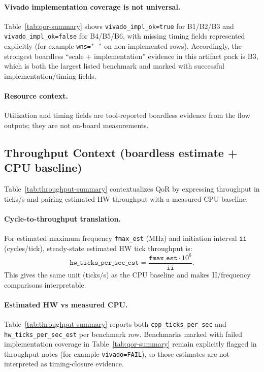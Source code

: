 \paragraph{Vivado implementation coverage is not universal.}
Table~\ref{tab:qor-summary} shows \texttt{vivado\_impl\_ok=true} for B1/B2/B3 and \texttt{vivado\_impl\_ok=false} for B4/B5/B6, with missing timing fields represented explicitly (for example \texttt{wns='-'} on non-implemented rows). Accordingly, the strongest boardless ``scale + implementation'' evidence in this artifact pack is B3, which is both the largest listed benchmark and marked with successful implementation/timing fields.

\paragraph{Resource context.}
Utilization and timing fields are tool-reported boardless evidence from the flow outputs; they are not on-board measurements.

\begin{table}[t]
\centering
\scriptsize

\caption{QoR summary (boardless) generated from \texttt{bench\_report.json} artifacts (source: \texttt{papers/paperA/artifacts/tables/results\_qor.csv}).}
\label{tab:qor-summary}
\end{table}

\subsection{Throughput Context (boardless estimate + CPU baseline)}
Table~\ref{tab:throughput-summary} contextualizes QoR by expressing throughput in ticks/s and pairing estimated HW throughput with a measured CPU baseline.

\paragraph{Cycle-to-throughput translation.}
For estimated maximum frequency \texttt{fmax\_est} (MHz) and initiation interval \texttt{ii} (cycles/tick), steady-state estimated HW tick throughput is:
\[
\texttt{hw\_ticks\_per\_sec\_est} = \frac{\texttt{fmax\_est} \cdot 10^{6}}{\texttt{ii}}.
\]
This gives the same unit (ticks/s) as the CPU baseline and makes II/frequency comparisons interpretable.

\paragraph{Estimated HW vs measured CPU.}
Table~\ref{tab:throughput-summary} reports both \texttt{cpp\_ticks\_per\_sec} and \texttt{hw\_ticks\_per\_sec\_est} per benchmark row. Benchmarks marked with failed implementation coverage in Table~\ref{tab:qor-summary} remain explicitly flagged in throughput notes (for example \texttt{vivado=FAIL}), so those estimates are not interpreted as timing-closure evidence.

